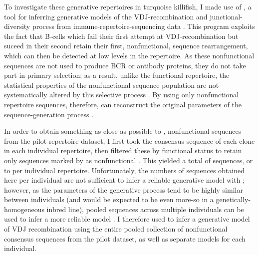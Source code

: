 To investigate these generative repertoires in turquoise killifish, I made use of , a tool for inferring generative models of the VDJ-recombination and junctional-diversity process from immune-repertoire-sequencing data \parencite{marcou2018igor}. This program exploits the fact that B-cells which fail their first attempt at VDJ-recombination but suceed in their second retain their first, nonfunctional, sequence rearrangement, which can then be detected at low levels in the repertoire. As these nonfunctional sequences are not used to produce BCR or antibody proteins, they do not take part in primary selection; as a result, unlike the functional repertoire, the statistical properties of the nonfunctional sequence population are not systematically altered by this selective process \parencite{elhanati2015model}. By using only nonfunctional repertoire sequences, therefore,  can reconstruct the original parameters of the sequence-generation process \parencite{marcou2018igor}.

In order to obtain something as close as possible to \naive, nonfunctional sequences from the pilot repertoire dataset, I first took the consensus sequence of each clone in each individual repertoire, then filtered these by functional status to retain only sequences marked by  as nonfunctional . This yielded a total of  sequences, or  to  per individual repertoire. Unfortunately, the numbers of sequences obtained here per individual are not sufficient to infer a reliable generative model with  \parencite{marcou2018igor,marcou2019perscomm}; however, as the parameters of the generative process tend to be highly similar between individuals (and would be expected to be even more-so in a genetically-homogeneous inbred line), pooled sequences across multiple individuals can be used to infer a more reliable model \parencite{marcou2019perscomm}. I therefore used  to infer a generative model of VDJ recombination using the entire pooled collection of nonfunctional consensus sequences from the pilot dataset, as well as separate models for each individual. 

